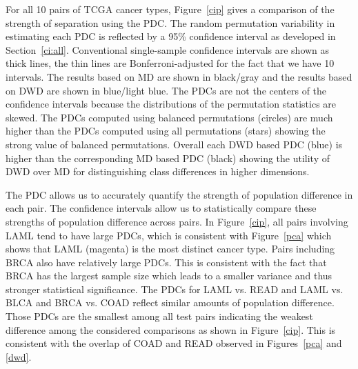 \documentclass[12pt]{article}
\begin{document}

For all 10 pairs of TCGA cancer types, Figure~\ref{cip} gives a comparison of the strength of separation using the PDC. The random permutation variability in estimating each PDC is reflected by a 95\% confidence interval as developed in Section~\ref{ci:all}. Conventional single-sample confidence intervals are shown as thick lines, the thin lines are Bonferroni-adjusted for the fact that we have 10 intervals. The results based on MD are shown in black/gray and the results based on DWD are shown in blue/light blue. The PDCs are not the centers of the confidence intervals because the distributions of the permutation statistics are skewed. The  PDCs computed using balanced permutations (circles) are much higher than the PDCs computed using all permutations (stars) showing the strong value of balanced permutations. Overall each DWD based PDC (blue) is higher than the corresponding MD based PDC (black) showing the utility of DWD over MD for distinguishing class differences in higher dimensions. 

The PDC allows us to accurately quantify the strength of population difference in each pair. The confidence intervals allow us to statistically compare these strengths of population difference across pairs. In Figure~\ref{cip}, all pairs involving LAML tend to have large PDCs, which is consistent with Figure~\ref{pca} which shows that LAML (magenta) is the most distinct cancer type. 
Pairs including BRCA also have relatively large PDCs. This is consistent with the fact that BRCA has the largest sample size which leads to a smaller variance and thus stronger statistical significance. The PDCs for LAML vs. READ and LAML vs. BLCA and BRCA vs. COAD reflect similar amounts of population difference. Those PDCs are the smallest among all test pairs indicating the weakest difference among the considered comparisons as shown in Figure~\ref{cip}.  This is consistent with the overlap of  COAD  and READ observed in Figures~\ref{pca} and \ref{dwd}.
\end{document}
